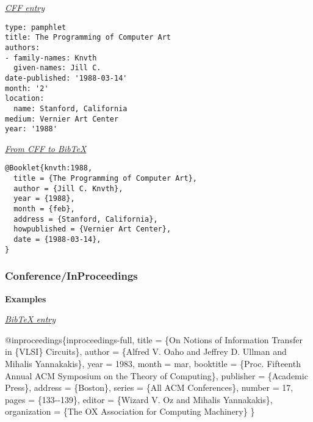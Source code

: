 \documentclass[
]{article}
\newenvironment{Shaded}{\begin{snugshade}}{\end{snugshade}}
\newcommand{\DataTypeTok}[1]{\textcolor[rgb]{0.13,0.29,0.53}{#1}}
\newcommand{\NormalTok}[1]{#1}
\newcommand{\OtherTok}[1]{\textcolor[rgb]{0.56,0.35,0.01}{#1}}
\newcommand{\StringTok}[1]{\textcolor[rgb]{0.31,0.60,0.02}{#1}}
\newcommand{\VariableTok}[1]{\textcolor[rgb]{0.00,0.00,0.00}{#1}}
\begin{document}
\underline{\emph{CFF entry}}

\begin{verbatim}
type: pamphlet
title: The Programming of Computer Art
authors:
- family-names: Knvth
  given-names: Jill C.
date-published: '1988-03-14'
month: '2'
location:
  name: Stanford, California
medium: Vernier Art Center
year: '1988'
\end{verbatim}

\underline{\emph{From CFF to BibTeX}}

\begin{verbatim}
@Booklet{knvth:1988,
  title = {The Programming of Computer Art},
  author = {Jill C. Knvth},
  year = {1988},
  month = {feb},
  address = {Stanford, California},
  howpublished = {Vernier Art Center},
  date = {1988-03-14},
}
\end{verbatim}

\hypertarget{conferenceinproceedings}{%
\subsubsection{Conference/InProceedings}\label{conferenceinproceedings}}

\textbf{Examples}

\underline{\emph{BibTeX entry}}

\begin{Shaded}
\begin{Highlighting}[]
\VariableTok{@inproceedings}\NormalTok{\{}\OtherTok{inproceedings}\NormalTok{{-}}\OtherTok{full}\NormalTok{,}
    \DataTypeTok{title}\NormalTok{        = \{On Notions of Information Transfer in \{VLSI\} Circuits\},}
    \DataTypeTok{author}\NormalTok{       = \{Alfred V. Oaho and Jeffrey D. Ullman and Mihalis Yannakakis\},}
    \DataTypeTok{year}\NormalTok{         = 1983,}
    \DataTypeTok{month}\NormalTok{        = }\StringTok{mar}\NormalTok{,}
    \DataTypeTok{booktitle}\NormalTok{    = \{Proc. Fifteenth Annual ACM Symposium on the Theory of Computing\},}
    \DataTypeTok{publisher}\NormalTok{    = \{Academic Press\},}
    \DataTypeTok{address}\NormalTok{      = \{Boston\},}
    \DataTypeTok{series}\NormalTok{       = \{All ACM Conferences\},}
    \DataTypeTok{number}\NormalTok{       = 17,}
    \DataTypeTok{pages}\NormalTok{        = \{133{-}{-}139\},}
    \DataTypeTok{editor}\NormalTok{       = \{Wizard V. Oz and Mihalis Yannakakis\},}
    \DataTypeTok{organization}\NormalTok{ = \{The OX Association for Computing Machinery\}}
\NormalTok{\}}
\end{Highlighting}
\end{Shaded}
\end{document}
